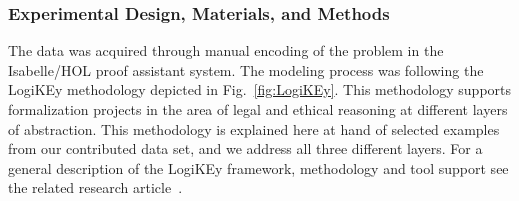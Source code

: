 \documentclass{article}
\newcommand{\comment}[1]{
}
\begin{document}
\comment{
[Describe your data and remember to refer to each data file (i.e. figure 1, figure 2, table 1, dataset, raw data, supplemental data, etc.) that are included in this article. Please provide a clear description of each file – do not simply list them. No insight, interpretation, background or conclusions should be included in this section. Min word 150, no maximum]
}

\subsubsection*{Experimental Design, Materials, and Methods}

The data was acquired through manual encoding of the problem in the
Isabelle/HOL \cite{Isabelle} proof assistant system. The modeling
process was following the LogiKEy methodology depicted in
Fig.~\ref{fig:LogiKEy}. This methodology supports formalization
projects in the area of legal and ethical reasoning at different
layers of abstraction. This methodology is explained here at hand of
selected examples from our contributed data set, and we address all three
different layers. For a general
description of the LogiKEy framework, methodology and tool support see
the related research article~\cite{J48}.
\end{document}
